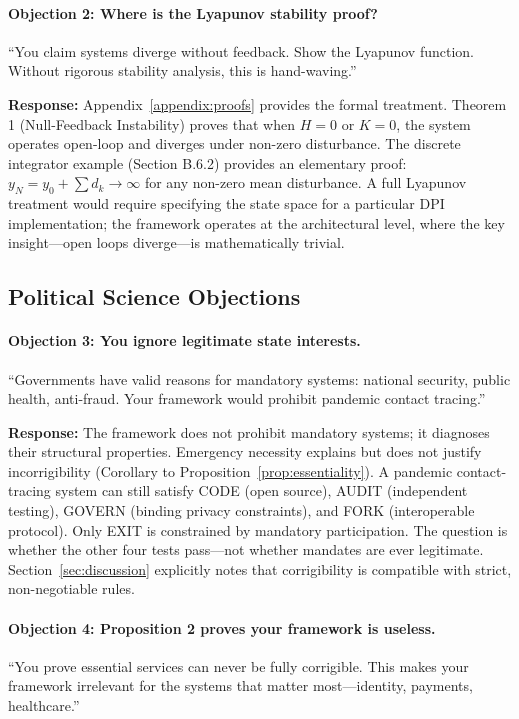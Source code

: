 \documentclass{article}
\begin{document}
\paragraph{Objection 2: Where is the Lyapunov stability proof?}
``You claim systems diverge without feedback. Show the Lyapunov function. Without rigorous stability analysis, this is hand-waving.''

\textbf{Response:} Appendix~\ref{appendix:proofs} provides the formal treatment. Theorem 1 (Null-Feedback Instability) proves that when $H=0$ or $K=0$, the system operates open-loop and diverges under non-zero disturbance. The discrete integrator example (Section B.6.2) provides an elementary proof: $y_N = y_0 + \sum d_k \to \infty$ for any non-zero mean disturbance. A full Lyapunov treatment would require specifying the state space for a particular DPI implementation; the framework operates at the architectural level, where the key insight---open loops diverge---is mathematically trivial.

\subsection{Political Science Objections}

\paragraph{Objection 3: You ignore legitimate state interests.}
``Governments have valid reasons for mandatory systems: national security, public health, anti-fraud. Your framework would prohibit pandemic contact tracing.''

\textbf{Response:} The framework does not prohibit mandatory systems; it diagnoses their structural properties. Emergency necessity explains but does not justify incorrigibility (Corollary to Proposition~\ref{prop:essentiality}). A pandemic contact-tracing system can still satisfy CODE (open source), AUDIT (independent testing), GOVERN (binding privacy constraints), and FORK (interoperable protocol). Only EXIT is constrained by mandatory participation. The question is whether the other four tests pass---not whether mandates are ever legitimate. Section~\ref{sec:discussion} explicitly notes that corrigibility is compatible with strict, non-negotiable rules.

\paragraph{Objection 4: Proposition 2 proves your framework is useless.}
``You prove essential services can never be fully corrigible. This makes your framework irrelevant for the systems that matter most---identity, payments, healthcare.''
\end{document}
